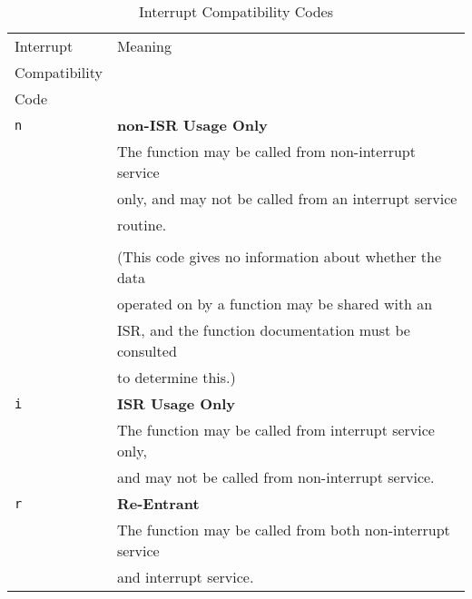 \begin{table}
\caption{Interrupt Compatibility Codes}
\label{tbl:ciov0:slcv0:sfnc0:01}
\begin{center}
\begin{tabular}{|l|l|}
\hline
Interrupt     & Meaning                                                        \\
Compatibility &                                                                \\
Code          &                                                                \\
\hline
\hline
\texttt{n}    & \textbf{non-ISR Usage Only}                                    \\
              & The function may be called from non-interrupt service          \\
              & only, and may not be called from an interrupt service          \\
              & routine.                                                       \\
              &                                                                \\
              & (This code gives no information about whether the data         \\
              & operated on by a function may be shared with an                \\
              & ISR, and the function documentation must be consulted          \\
              & to determine this.)                                            \\
\hline
\texttt{i}    & \textbf{ISR Usage Only}                                        \\
              & The function may be called from interrupt service only,        \\
              & and may not be called from non-interrupt service.              \\
\hline
\texttt{r}    & \textbf{Re-Entrant}                                            \\
              & The function may be called from both non-interrupt service     \\
              & and interrupt service.                                         \\
\hline
\end{tabular}
\end{center}
\end{table}


